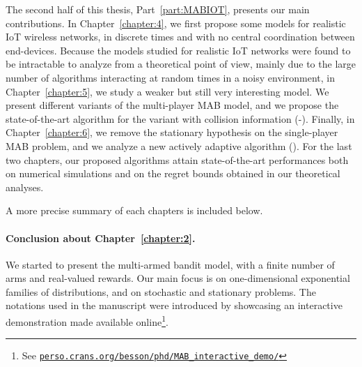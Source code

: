 The second half of this thesis, Part~\ref{part:MABIOT}, presents our main contributions.
In Chapter~\ref{chapter:4}, we first propose some models for realistic IoT wireless networks, in discrete times and with no central coordination between end-devices.
Because the models studied for realistic IoT networks were found to be intractable to analyze from a theoretical point of view, mainly due to the large number of algorithms interacting at random times in a noisy environment,
in Chapter~\ref{chapter:5}, we study a weaker but still very interesting model.
We present different variants of the multi-player MAB model, and we propose the state-of-the-art algorithm for the variant with collision information (\MCTopM-\klUCB).
Finally, in Chapter~\ref{chapter:6}, we remove the stationary hypothesis on the single-player MAB problem, and we analyze a new actively adaptive algorithm (\GLRklUCB).
%
For the last two chapters, our proposed algorithms attain state-of-the-art performances both on numerical simulations and on the regret bounds obtained in our theoretical analyses.

A more precise summary of each chapters is included below.




\paragraph{Conclusion about \textbf{Chapter~\ref{chapter:2}}.}

We started to present the multi-armed bandit model, with a finite number of arms and real-valued rewards.
Our main focus is on one-dimensional exponential families of distributions, and on stochastic and stationary problems.
The notations used in the manuscript were introduced by showcasing an interactive demonstration made available online\footnote{See \href{https://perso.crans.org/besson/phd/MAB\_interactive\_demo/}{\texttt{perso.crans.org/besson/phd/MAB\_interactive\_demo/}}}.

